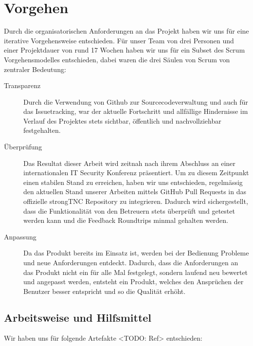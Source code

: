 \chapter{Vorgehen}

Durch die organisatorischen Anforderungen an das Projekt haben wir uns für eine
iterative Vorgehensweise entschieden. Für unser Team von drei Personen und einer
Projektdauer von rund 17 Wochen haben wir uns für ein Subset des Scrum Vorgehensmodelles
entschieden, dabei waren die drei Säulen von Scrum von zentraler Bedeutung:

\begin{description}
	\item[Transparenz] Durch die Verwendung von Github zur Sourcecodeverwaltung und
	auch für das Issuetracking, war der aktuelle Fortschritt und allfällige
	Hindernisse im Verlauf des Projektes stets sichtbar, öffentlich und
	nachvollziehbar festgehalten.

	\item[Überprüfung] Das Resultat dieser Arbeit wird zeitnah nach ihrem Abschluss
	an einer internationalen IT Security Konferenz präsentiert. Um zu diesem
	Zeitpunkt einen stabilen Stand zu erreichen, haben wir uns entschieden, regelmässig den aktuellen Stand unserer Arbeiten mittels GitHub Pull Requests
	in das offizielle strongTNC Repository zu integrieren. Dadurch wird
	sichergestellt, dass die Funktionalität von den Betreuern stets überprüft und
	getestet werden kann und die Feedback Roundtrips minmal gehalten werden.

	\item[Anpassung] Da das Produkt bereits im Einsatz ist, werden bei der
	Bedienung Probleme und neue Anforderungen entdeckt. Dadurch, dass die
	Anforderungen an das Produkt nicht ein für alle Mal festgelegt, sondern laufend
	neu bewertet und angepasst werden, entsteht ein Produkt, welches den Ansprüchen
	der Benutzer besser entspricht und so die Qualität erhöht.

\end{description}

\section{Arbeitsweise und Hilfsmittel}
Wir haben uns für folgende Artefakte <TODO: Ref> entschieden:


